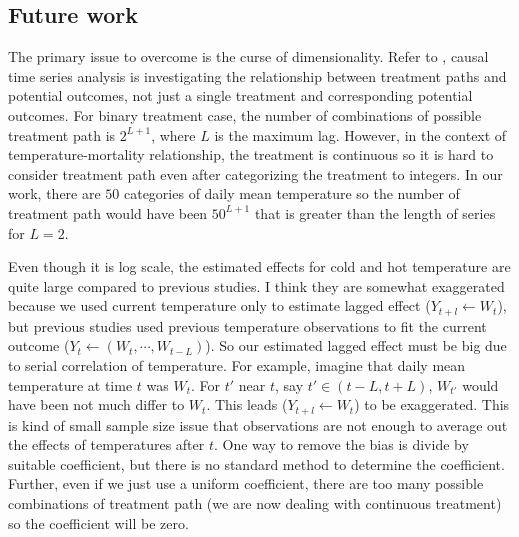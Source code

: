 \documentclass[12pt]{article}
\begin{document}
\subsection{Future work}
The primary issue to overcome is the curse of dimensionality.
Refer to \cite{bojinov2019}, 
causal time series analysis is investigating the relationship between treatment paths and potential outcomes,
not just a single treatment and corresponding potential outcomes.
For binary treatment case, the number of combinations of possible treatment path is $2^{L+1}$,
where $L$ is the maximum lag.
However, in the context of temperature-mortality relationship,
the treatment is continuous so it is hard to consider treatment path
even after categorizing the treatment to integers.
In our work, there are $50$ categories of daily mean temperature 
so the number of treatment path would have been $50^{L+1}$ 
that is greater than the length of series for $L = 2$.

Even though it is log scale, 
the estimated effects for cold and hot temperature are quite large compared to previous studies.
I think they are somewhat exaggerated
because we used current temperature only to estimate lagged effect ($Y_{t+l} \leftarrow W_t$),
but previous studies used previous temperature observations 
to fit the current outcome ($Y_t \leftarrow (W_t, \cdots, W_{t-L})$).
So our estimated lagged effect must be big due to serial correlation of temperature.
For example, imagine that daily mean temperature at time $t$ was $W_t$.
For $t'$ near $t$, say $t' \in (t-L, t+L)$, $W_{t'}$ would have been not much differ to $W_t$.
This leads ($Y_{t+l} \leftarrow W_t$) to be exaggerated.
This is kind of small sample size issue that observations are not enough
to average out the effects of temperatures after $t$.
One way to remove the bias is divide by suitable coefficient\cite{bojinov2019},
but there is no standard method to determine the coefficient.
Further, even if we just use a uniform coefficient,
there are too many possible combinations of treatment path (we are now dealing with continuous treatment)
so the coefficient will be zero.
{}

\end{document}
